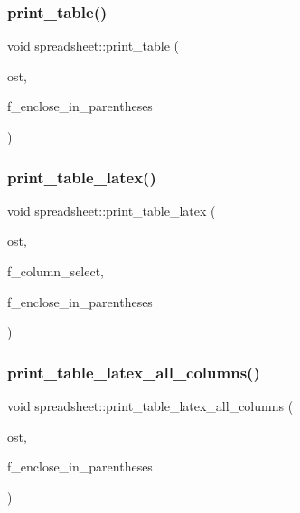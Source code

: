 \subsubsection{\texorpdfstring{print\+\_\+table()}{print\_table()}}
{\footnotesize\ttfamily void spreadsheet\+::print\+\_\+table (\begin{DoxyParamCaption}\item[{ostream \&}]{ost,  }\item[{\mbox{\hyperlink{galois_8h_a09fddde158a3a20bd2dcadb609de11dc}{I\+NT}}}]{f\+\_\+enclose\+\_\+in\+\_\+parentheses }\end{DoxyParamCaption})}

\mbox{\label{classspreadsheet_a382f1b41cd82aeec9dc7865cad0989c0}} 
\subsubsection{\texorpdfstring{print\+\_\+table\+\_\+latex()}{print\_table\_latex()}}
{\footnotesize\ttfamily void spreadsheet\+::print\+\_\+table\+\_\+latex (\begin{DoxyParamCaption}\item[{ostream \&}]{ost,  }\item[{\mbox{\hyperlink{galois_8h_a09fddde158a3a20bd2dcadb609de11dc}{I\+NT}} $\ast$}]{f\+\_\+column\+\_\+select,  }\item[{\mbox{\hyperlink{galois_8h_a09fddde158a3a20bd2dcadb609de11dc}{I\+NT}}}]{f\+\_\+enclose\+\_\+in\+\_\+parentheses }\end{DoxyParamCaption})}

\mbox{\label{classspreadsheet_a076a383a8c52718d6c3aa60aa0f2da0c}} 
\subsubsection{\texorpdfstring{print\+\_\+table\+\_\+latex\+\_\+all\+\_\+columns()}{print\_table\_latex\_all\_columns()}}
{\footnotesize\ttfamily void spreadsheet\+::print\+\_\+table\+\_\+latex\+\_\+all\+\_\+columns (\begin{DoxyParamCaption}\item[{ostream \&}]{ost,  }\item[{\mbox{\hyperlink{galois_8h_a09fddde158a3a20bd2dcadb609de11dc}{I\+NT}}}]{f\+\_\+enclose\+\_\+in\+\_\+parentheses }\end{DoxyParamCaption})}

